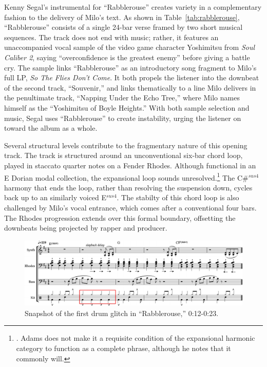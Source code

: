 Kenny Segal's instrumental for ``Rabblerouse'' creates variety in a complementary fashion to the delivery of Milo's text. As shown in Table~\ref{tab:rabblerouse}, ``Rabblerouse'' consists of a single 24-bar verse framed by two short musical sequences. The track does not end with music; rather, it features an unaccompanied vocal sample of the video game character Yoshimitsu from \emph{Soul Caliber 2}, saying ``overconfidence is the greatest enemy'' before giving a battle cry. The sample links ``Rabblerouse'' as an introductory song fragment to Milo's full LP, \emph{So The Flies Don't Come}. It both propels the listener into the downbeat of the second track, ``Souvenir,'' and links thematically to a line Milo delivers in the penultimate track, ``Napping Under the Echo Tree,'' where Milo names himself as the ``Yoshimitsu of Boyle Heights.'' With both sample selection and music, Segal uses ``Rabblerouse'' to create instability, urging the listener on toward the album as a whole.

Several structural levels contribute to the fragmentary nature of this opening track. The track is structured around an unconventional six-bar chord loop, played in staccato quarter notes on a Fender Rhodes. Although functional in an E Dorian modal collection, the expansional loop sounds unresolved.\footnote{\cite{kyleadamsHarmonicSyntacticMotivic2020}. Adams does not make it a requisite condition of the expansional harmonic category to function as a complete phrase, although he notes that it commonly will.} The C\#$^{sus4}$ harmony that ends the loop, rather than resolving the suspension down, cycles back up to an similarly voiced E$^{sus4}$. The stabilty of this chord loop is also challenged by Milo's vocal entrance, which comes after a conventional four bars. The Rhodes progression extends over this formal boundary, offsetting the downbeats being projected by rapper and producer.

    \begin{figure}[ht]
        \centering
        \includegraphics[width=\textwidth]{images/figures/chp 02/012023rabblefirstglitch.pdf}
        \caption{Snapshot of the first drum glitch in ``Rabblerouse,'' 0:12-0:23.}
        \label{fig:rabblefirstglitch}
    \end{figure}

